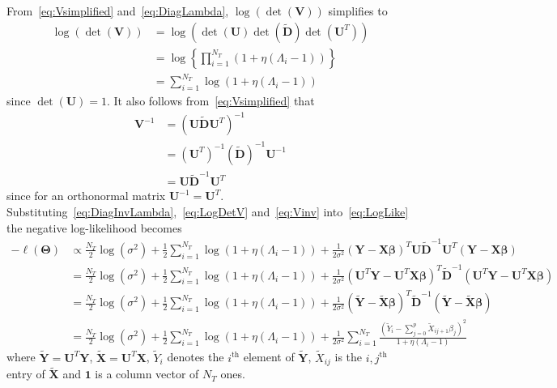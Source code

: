 \documentclass[12pt,letter]{article}\usepackage[]{graphicx}\usepackage[]{color}
\newcommand{\tm}[1]{\textrm{{#1}}}
\newcommand{\bX}{\textbf{X}}
\newcommand{\bY}{\textbf{Y}}
\newcommand{\bD}{\textbf{D}}
\newcommand{\bXtilde}{\widetilde{\bX}}
\newcommand{\bYtilde}{\widetilde{\bY}}
\newcommand{\Xtilde}{\widetilde{X}}
\newcommand{\Ytilde}{\widetilde{Y}}
\newcommand{\bU}{\textbf{U}}
\newcommand{\bV}{\textbf{V}}
\newcommand{\bTheta}{\boldsymbol{\Theta}}
\newcommand{\bbeta}{\boldsymbol{\beta}}
\begin{document}
From~\eqref{eq:Vsimplified} and~\eqref{eq:DiagLambda}, $\log(\det(\bV))$ simplifies to
\begin{align}
	\log(\det(\bV)) & =  \log  \left(  \det(\bU) \det\left(\widetilde{\bD}\right) \det(\bU^T)\right)   \nonumber \\
	& =\log\left\lbrace \prod_{i=1}^{N_T}  \left( 1 + \eta (\Lambda_i-1) \right)  \right\rbrace \nonumber \\
	& = \sum_{i=1}^{N_T} \log(1 + \eta (\Lambda_i-1)) \label{eq:LogDetV}
\end{align}
since $\det(\bU) = 1$. It also follows from~\eqref{eq:Vsimplified} that
\begin{align}
	\bV^{-1} & = \left( \bU \widetilde{\bD} \bU^T \right)^{-1} \nonumber \\
	& = \left( \bU^T \right)^{-1}  \left(\widetilde{\bD}\right)^{-1}    \bU^{-1} \nonumber \\
	& = \bU \widetilde{\bD}^{-1} \bU^T \label{eq:Vinv}
\end{align}
since for an orthonormal matrix $\bU^{-1} = \bU^T$. Substituting~\eqref{eq:DiagInvLambda},~\eqref{eq:LogDetV} and~\eqref{eq:Vinv} into~\eqref{eq:LogLike} the negative log-likelihood becomes
\begin{align}
	-\ell(\bTheta) & \propto \frac{N_T}{2}\log(\sigma^2) + \frac{1}{2} \sum_{i=1}^{N_T} \log(1 + \eta (\Lambda_i-1)) + \frac{1}{2\sigma^2} \left(\bY - \bX \bbeta\right)^T \bU \widetilde{\bD}^{-1} \bU^T \left(\bY - \bX \bbeta\right) \label{eq:Likelihood} \\
	& = \frac{N_T}{2}\log(\sigma^2) + \frac{1}{2} \sum_{i=1}^{N_T} \log(1 + \eta (\Lambda_i-1)) + \frac{1}{2\sigma^2} \left(\bU^T\bY - \bU^T\bX \bbeta\right)^T \widetilde{\bD}^{-1} \left(\bU^T\bY - \bU^T\bX \bbeta\right)  \nonumber\\
	& = \frac{N_T}{2}\log(\sigma^2) + \frac{1}{2} \sum_{i=1}^{N_T} \log(1 + \eta (\Lambda_i-1)) + \frac{1}{2\sigma^2} \left(\bYtilde - \bXtilde \bbeta\right)^T \widetilde{\bD}^{-1} \left(\bYtilde - \bXtilde \bbeta\right)  \nonumber\\
	& = \frac{N_T}{2}\log(\sigma^2) + \frac{1}{2} \sum_{i=1}^{N_T} \log(1 + \eta (\Lambda_i-1)) + \frac{1}{2\sigma^2} \sum_{i=1}^{N_T}\frac{\left(  \Ytilde_i - \sum_{j=0}^{p}\Xtilde_{ij+1}\beta_j \right) ^2}{1 + \eta (\Lambda_i-1)}  \label{eq:LikeFinal}
\end{align}
where $\bYtilde = \bU^T \bY$, $\bXtilde = \bU^T \bX$, $\Ytilde_i$ denotes the $i^{\tm{th}}$ element of $\bYtilde$, $\Xtilde_{ij}$ is the $i,j^{\tm{th}}$ entry of $\bXtilde$ and $\mathbf{1}$ is a column vector of $N_T$ ones.
\end{document}

